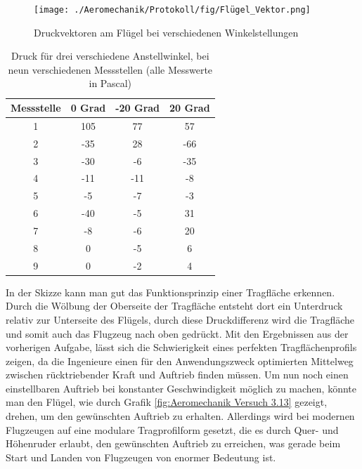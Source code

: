 \begin{figure}[h!]
    \centering
    \texttt{[image: ./Aeromechanik/Protokoll/fig/Flügel\_Vektor.png]}
    \caption{Druckvektoren am Flügel bei verschiedenen Winkelstellungen}
    \label{fig:Venturi}
\end{figure}

\begin{table}
    \centering
    \caption{Druck für drei verschiedene Anstellwinkel, bei neun verschiedenen Messstellen (alle Messwerte in Pascal)}
    \begin{tabular}{c c c c}
    \hline
    Messstelle & 0 Grad & -20 Grad & 20 Grad \\
    \hline
    1 & 105 & 77 & 57 \\
    2 & -35 &  28 & -66 \\
    3 & -30 & -6 & -35 \\
    4 & -11 & -11 & -8 \\
    5 & -5 & -7 & -3 \\
    6 & -40 & -5 & 31 \\
    7 & -8 & -6 & 20 \\
    8 & 0 & -5 & 6 \\
    9 & 0 & -2 & 4 \\
    \hline
    \end{tabular}
    \label{tab:Aeromechanik Versuch 3.2}
\end{table}

In der Skizze kann man gut das Funktionsprinzip einer Tragfläche erkennen. Durch die Wölbung der Oberseite der Tragfläche entsteht dort ein Unterdruck relativ zur Unterseite des Flügels, durch diese Druckdifferenz wird die Tragfläche und somit auch das Flugzeug nach oben gedrückt. Mit den Ergebnissen aus der vorherigen Aufgabe, lässt sich die Schwierigkeit eines perfekten Tragflächenprofils zeigen, da die Ingenieure einen für den Anwendungszweck optimierten Mittelweg zwischen rücktriebender Kraft und Auftrieb finden müssen. Um nun noch einen einstellbaren Auftrieb bei konstanter Geschwindigkeit möglich zu machen, könnte man den Flügel, wie durch Grafik \ref{fig:Aeromechanik Versuch 3.13} gezeigt, drehen, um den gewünschten Auftrieb zu erhalten. Allerdings wird bei modernen Flugzeugen auf eine modulare Tragprofilform gesetzt, die es durch Quer- und Höhenruder erlaubt, den gewünschten Auftrieb zu erreichen, was gerade beim Start und Landen von Flugzeugen von enormer Bedeutung ist.

